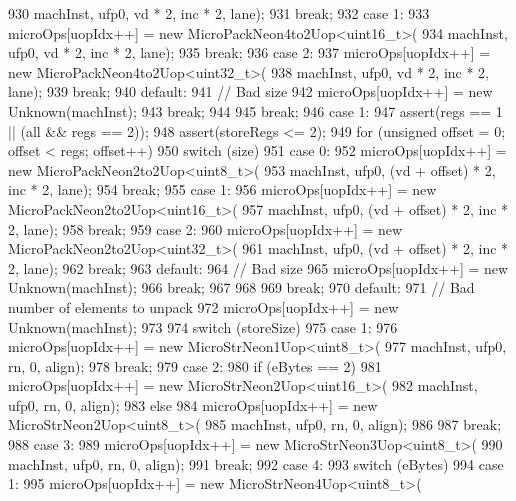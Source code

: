 \begin{DoxyCode}
{{{930                     machInst, ufp0, vd * 2, inc * 2, lane);
931             break;
932           case 1:
933             microOps[uopIdx++] = new MicroPackNeon4to2Uop<uint16_t>(
934                     machInst, ufp0, vd * 2, inc * 2, lane);
935             break;
936           case 2:
937             microOps[uopIdx++] = new MicroPackNeon4to2Uop<uint32_t>(
938                     machInst, ufp0, vd * 2, inc * 2, lane);
939             break;
940           default:
941             // Bad size
942             microOps[uopIdx++] = new Unknown(machInst);
943             break;
944         }
945         break;
946       case 1:
947         assert(regs == 1 || (all && regs == 2));
948         assert(storeRegs <= 2);
949         for (unsigned offset = 0; offset < regs; offset++) {
950             switch (size) {
951               case 0:
952                 microOps[uopIdx++] = new MicroPackNeon2to2Uop<uint8_t>(
953                         machInst, ufp0, (vd + offset) * 2, inc * 2, lane);
954                 break;
955               case 1:
956                 microOps[uopIdx++] = new MicroPackNeon2to2Uop<uint16_t>(
957                         machInst, ufp0, (vd + offset) * 2, inc * 2, lane);
958                 break;
959               case 2:
960                 microOps[uopIdx++] = new MicroPackNeon2to2Uop<uint32_t>(
961                         machInst, ufp0, (vd + offset) * 2, inc * 2, lane);
962                 break;
963               default:
964                 // Bad size
965                 microOps[uopIdx++] = new Unknown(machInst);
966                 break;
967             }
968         }
969         break;
970       default:
971         // Bad number of elements to unpack
972         microOps[uopIdx++] = new Unknown(machInst);
973     }
974     switch (storeSize) {
975       case 1:
976         microOps[uopIdx++] = new MicroStrNeon1Uop<uint8_t>(
977                 machInst, ufp0, rn, 0, align);
978         break;
979       case 2:
980         if (eBytes == 2) {
981             microOps[uopIdx++] = new MicroStrNeon2Uop<uint16_t>(
982                     machInst, ufp0, rn, 0, align);
983         } else {
984             microOps[uopIdx++] = new MicroStrNeon2Uop<uint8_t>(
985                     machInst, ufp0, rn, 0, align);
986         }
987         break;
988       case 3:
989         microOps[uopIdx++] = new MicroStrNeon3Uop<uint8_t>(
990                 machInst, ufp0, rn, 0, align);
991         break;
992       case 4:
993         switch (eBytes) {
994           case 1:
995             microOps[uopIdx++] = new MicroStrNeon4Uop<uint8_t>(
}}}
\end{DoxyCode}
